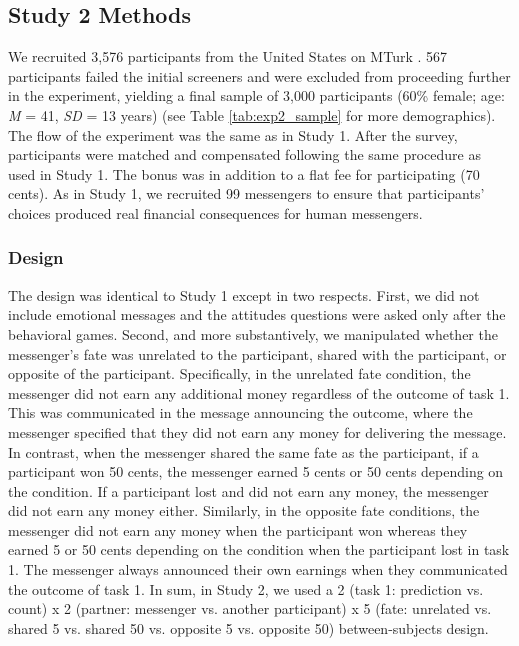 \subsection{Study 2 Methods}

We recruited 3,576 participants from the United States on MTurk
\citep{berinsky2012evaluating}. 567 participants failed the initial screeners
and were excluded from proceeding further in the experiment, yielding a
final sample of 3,000 participants (60\% female; age: \emph{M} = 41,
\emph{SD} = 13 years) (see Table \ref{tab:exp2_sample} for more demographics). 
The flow of the experiment was the same as in
Study 1. After the survey, participants were matched and compensated
following the same procedure as used in Study 1. The bonus was in
addition to a flat fee for participating (70 cents). As in Study 1, we
recruited 99 messengers to ensure that participants' choices produced
real financial consequences for human messengers.

\subsubsection{Design}

The design was identical to Study 1 except in two respects. First, we
did not include emotional messages and the attitudes questions were
asked only after the behavioral games. Second, and more substantively,
we manipulated whether the messenger's fate was unrelated to the
participant, shared with the participant, or opposite of the
participant. Specifically, in the unrelated fate condition, the
messenger did not earn any additional money regardless of the outcome of
task 1. This was communicated in the message announcing the outcome,
where the messenger specified that they did not earn any money for
delivering the message. In contrast, when the messenger shared the same
fate as the participant, if a participant won 50 cents, the messenger
earned 5 cents or 50 cents depending on the condition. If a participant
lost and did not earn any money, the messenger did not earn any money
either. Similarly, in the opposite fate conditions, the messenger did
not earn any money when the participant won whereas they earned 5 or 50
cents depending on the condition when the participant lost in task 1. 
The messenger always announced their own earnings when they communicated
the outcome of task 1. In sum, in Study 2, we used a 2 (task 1:
prediction vs. count) x 2 (partner: messenger vs. another participant) x
5 (fate: unrelated vs. shared 5 vs. shared 50 vs. opposite 5 vs.
opposite 50) between-subjects design.

